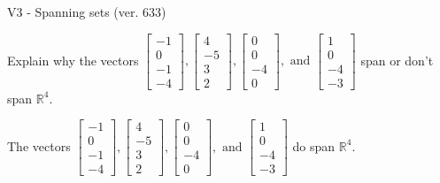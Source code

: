 \begin{exercise}
  \begin{exerciseTitle}V3 - Spanning sets (ver. 633)\end{exerciseTitle}
  \begin{exerciseStatement}
    Explain why the vectors \(\left[\begin{array}{r}
-1 \\
0 \\
-1 \\
-4
\end{array}\right] , \left[\begin{array}{r}
4 \\
-5 \\
3 \\
2
\end{array}\right] , \left[\begin{array}{r}
0 \\
0 \\
-4 \\
0
\end{array}\right] , \text{ and } \left[\begin{array}{r}
1 \\
0 \\
-4 \\
-3
\end{array}\right]\) span or don't span \(\mathbb{R}^4\). 
	


  \end{exerciseStatement}
  \begin{exerciseAnswer}
   The vectors \(\left[\begin{array}{r}
-1 \\
0 \\
-1 \\
-4
\end{array}\right] , \left[\begin{array}{r}
4 \\
-5 \\
3 \\
2
\end{array}\right] , \left[\begin{array}{r}
0 \\
0 \\
-4 \\
0
\end{array}\right] , \text{ and } \left[\begin{array}{r}
1 \\
0 \\
-4 \\
-3
\end{array}\right]\) 
  	 do  
	span \(\mathbb{R}^4\).
  


  \end{exerciseAnswer}
\end{exercise}